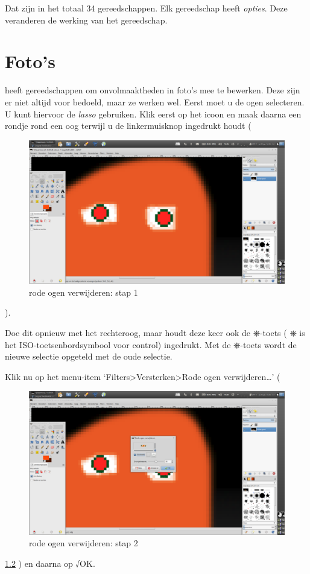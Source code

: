 \documentclass[11pt,a5paper,twoside]{book}
\begin{document}
  Dat zijn in het totaal 34 gereedschappen.
   Elk gereedschap heeft \textit{opties}. Deze veranderen de werking van het
    gereedschap.
\chapter{Foto’s}
 \label{ding:correctie}
  \GIMP{} heeft gereedschappen om onvolmaaktheden in foto’s mee te bewerken.
   Deze zijn er niet altijd voor bedoeld, maar ze werken wel.
  \label{ding:rode ogen}
   Eerst moet u de ogen selecteren. U kunt hiervoor de \textit{lasso}
    gebruiken. Klik eerst op het icoon en maak daarna een rondje rond een oog
    terwijl u de linkermuisknop ingedrukt houdt (%
    \begin{figure}
     \includegraphics[width=0.90\linewidth]{redeyes/1.png}
     \caption{rode ogen verwijderen: stap 1}\label{gx:redeyes/1}%
    \end{figure}).

   Doe dit opnieuw met het rechteroog, maar houdt deze keer ook de ⎈-toets (%
    ⎈ is het ISO-toetsenbordsymbool voor control)
    ingedrukt. Met de ⎈-toets wordt de nieuwe selectie opgeteld met de oude selectie.

   Klik nu op het menu-item ‘Filters>Versterken>Rode ogen verwijderen…’ (%
    \begin{figure}
     \includegraphics[width=0.90\linewidth]{redeyes/2.png}
     \caption{rode ogen verwijderen: stap 2}
     \label{gx:redeyes/2}%
    \end{figure}\ref{gx:redeyes/2}
    ) en daarna op √OK.
\end{document}
